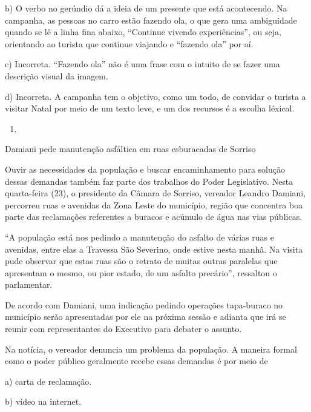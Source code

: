 b) O verbo no gerúndio dá a ideia de um presente que está acontecendo.
Na campanha, as pessoas no carro estão fazendo ola, o que gera uma
ambiguidade quando se lê a linha fina abaixo, ``Continue vivendo
experiências'', ou seja, orientando ao turista que continue viajando e
``fazendo ola'' por aí.

c) Incorreta. ``Fazendo ola'' não é uma frase com o intuito de se fazer
uma descrição visual da imagem.

d) Incorreta. A campanha tem o objetivo, como um todo, de convidar o
turista a visitar Natal por meio de um texto leve, e um dos recursos é a
escolha léxical.

\begin{enumerate}
\def\labelenumi{\arabic{enumi}.}
\setcounter{enumi}{13}
\tightlist
\item
\end{enumerate}

Damiani pede manutenção asfáltica em ruas esburacadas de Sorriso

Ouvir as necessidades da população e buscar encaminhamento para solução
dessas demandas também faz parte dos trabalhos do Poder Legislativo.
Nesta quarta-feira (23), o presidente da Câmara de Sorriso, vereador
Leandro Damiani, percorreu ruas e avenidas da Zona Leste do município,
região que concentra boa parte das reclamações referentes a buracos e
acúmulo de água nas vias públicas.

``A população está nos pedindo a manutenção do asfalto de várias ruas e
avenidas, entre elas a Travessa São Severino, onde estive nesta manhã.
Na visita pude observar que estas ruas são o retrato de muitas outras
paralelas que apresentam o mesmo, ou pior estado, de um asfalto
precário'', ressaltou o parlamentar.

De acordo com Damiani, uma indicação pedindo operações tapa-buraco no
município serão apresentadas por ele na próxima sessão e adianta que irá
se reunir com representantes do Executivo para debater o assunto.


Na notícia, o vereador denuncia um problema da população. A maneira
formal como o poder público geralmente recebe essas demandas é por meio
de

a) carta de reclamação.

b) vídeo na internet.

